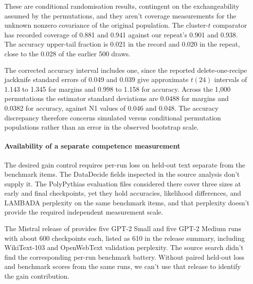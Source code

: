 These are conditional randomisation results, contingent on the exchangeability assumed by the permutations, and they aren't coverage measurements for the unknown nonzero covariance of the original population. The cluster-$t$ comparator has recorded coverage of 0.881 and 0.941 against our repeat's 0.901 and 0.938. The accuracy upper-tail fraction is 0.021 in the record and 0.020 in the repeat, close to the 0.028 of the earlier 500 draws.

The corrected accuracy interval includes one, since the reported delete-one-recipe jackknife standard errors of 0.049 and 0.039 give approximate $t(24)$ intervals of 1.143 to 1.345 for margins and 0.998 to 1.158 for accuracy. Across the 1,000 permutations the estimator standard deviations are 0.0488 for margins and 0.0382 for accuracy, against N1 values of 0.046 and 0.048. The accuracy discrepancy therefore concerns simulated versus conditional permutation populations rather than an error in the observed bootstrap scale.
\paragraph{Availability of a separate competence measurement}
The desired gain control requires per-run loss on held-out text separate from the benchmark items. The DataDecide fields inspected in the source analysis don't supply it. The PolyPythias evaluation files considered there cover three sizes at early and final checkpoints, yet they hold accuracies, likelihood differences, and LAMBADA perplexity on the same benchmark items, and that perplexity doesn't provide the required independent measurement scale.

The Mistral release of \citet{karamcheti2021} provides five GPT-2 Small and five GPT-2 Medium runs with about 600 checkpoints each, listed as 610 in the release summary, including WikiText-103 and OpenWebText validation perplexity. The source search didn't find the corresponding per-run benchmark battery. Without paired held-out loss and benchmark scores from the same runs, we can't use that release to identify the gain contribution.

